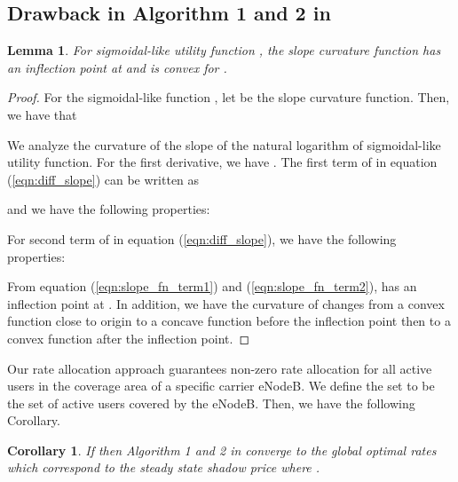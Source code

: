 \documentclass[journal]{IEEEtran} 		\usepackage{amsmath,amssymb}
\newtheorem{lem}[thm]{Lemma}
\newtheorem{cor}[thm]{Corollary}
\begin{document}
\subsection{Drawback in Algorithm 1 and 2 in \cite{Ahmed_Utility4}}\label{sec:conv_drawbacks}
\begin{lem}\label{lem:slope_curve}
For sigmoidal-like utility function ,  the slope curvature function  has an inflection point at  and is convex for .
\end{lem}
\begin{proof}
For the sigmoidal-like function , let  be the slope curvature function. Then, we have that

We analyze the curvature of the slope of the natural logarithm of sigmoidal-like utility function. For the first derivative, we have . The first term  of  in equation (\ref{eqn:diff_slope}) can be written as

and we have the following properties:

For second term  of  in equation (\ref{eqn:diff_slope}), we have the following properties:

From equation (\ref{eqn:slope_fn_term1}) and (\ref{eqn:slope_fn_term2}),  has an inflection point at . In addition, we have the curvature of  changes from a convex function close to origin to a concave function before the inflection point  then to a convex function after the inflection point.
\end{proof}
Our rate allocation approach guarantees non-zero rate allocation for all active users in the coverage area of a specific carrier eNodeB. We define the set  to be the set of active users covered by the  eNodeB. Then, we have the following Corollary.
\begin{cor}\label{cor:sig_convergence}
If  then Algorithm 1 and  2 in \cite{Ahmed_Utility4} converge to the global optimal rates which correspond to the steady state shadow price  where .
\end{cor}
\end{document}
